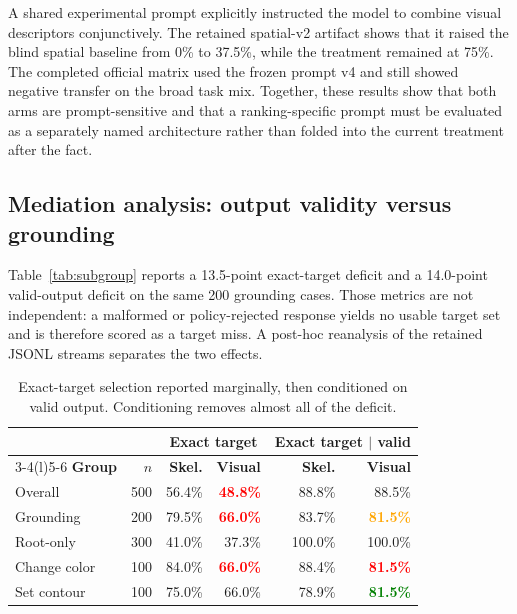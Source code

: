 \documentclass[10pt,a4paper]{article}
\newcommand{\good}[1]{\textcolor{green}{\textbf{#1}}}
\newcommand{\bad}[1]{\textcolor{red}{\textbf{#1}}}
\newcommand{\caution}[1]{\textcolor{orange}{\textbf{#1}}}
\begin{document}
A shared experimental prompt explicitly instructed the model to combine visual
descriptors conjunctively. The retained spatial-v2 artifact shows that it
raised the blind spatial baseline from 0\% to 37.5\%, while the treatment
remained at 75\%. The completed official matrix used the frozen prompt v4 and
still showed negative transfer on the broad task mix. Together, these results
show that both arms are prompt-sensitive and that a ranking-specific prompt
must be evaluated as a separately named architecture rather than folded into
the current treatment after the fact.

\subsection{Mediation analysis: output validity versus grounding}
\label{sec:mediation}

Table~\ref{tab:subgroup} reports a 13.5-point exact-target deficit and a
14.0-point valid-output deficit on the same 200 grounding cases. Those metrics
are not independent: a malformed or policy-rejected response yields no usable
target set and is therefore scored as a target miss. A post-hoc reanalysis of
the retained JSONL streams separates the two effects.

\begin{table}[H]
\centering
\caption{Exact-target selection reported marginally, then conditioned on
valid output. Conditioning removes almost all of the deficit.}
\begin{tabular}{@{}lrrrrr@{}}
\toprule
& & \multicolumn{2}{c}{\textbf{Exact target}} &
\multicolumn{2}{c}{\textbf{Exact target \(\mid\) valid}}\\
\cmidrule(lr){3-4}\cmidrule(l){5-6}
\textbf{Group} & \textbf{\(n\)} & \textbf{Skel.} & \textbf{Visual} &
\textbf{Skel.} & \textbf{Visual}\\
\midrule
Overall & 500 & 56.4\% & \bad{48.8\%} & 88.8\% & 88.5\%\\
Grounding & 200 & 79.5\% & \bad{66.0\%} & 83.7\% & \caution{81.5\%}\\
Root-only & 300 & 41.0\% & 37.3\% & 100.0\% & 100.0\%\\
\addlinespace
\quad Change color & 100 & 84.0\% & \bad{66.0\%} & 88.4\% & \bad{81.5\%}\\
\quad Set contour & 100 & 75.0\% & 66.0\% & 78.9\% & \good{81.5\%}\\
\bottomrule
\end{tabular}
\end{table}
\end{document}
